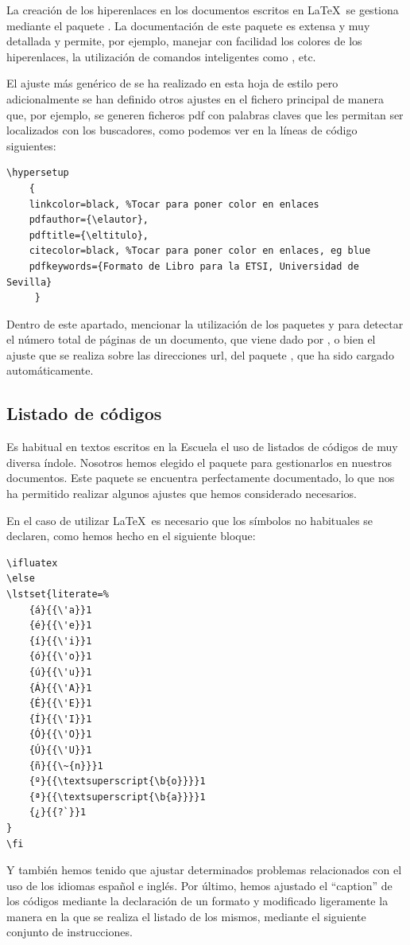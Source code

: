 La creación de los hiperenlaces en los documentos escritos en \LaTeX\ se gestiona mediante el paquete . La documentación de este paquete es extensa y muy detallada y permite, por ejemplo, manejar con facilidad los colores de los hiperenlaces, la utilización de comandos inteligentes como , etc. 

El ajuste más genérico de  se ha realizado en esta hoja de estilo pero adicionalmente se han definido otros ajustes en el fichero principal de manera que, por ejemplo, se generen ficheros pdf con palabras claves que les permitan ser localizados con los buscadores, como podemos ver en la líneas de código siguientes:

\begin{lstlisting}[frame=none]
\hypersetup
	{
 	linkcolor=black, %Tocar para poner color en enlaces
	pdfauthor={\elautor},
	pdftitle={\eltitulo}, 
	citecolor=black, %Tocar para poner color en enlaces, eg blue
	pdfkeywords={Formato de Libro para la ETSI, Universidad de Sevilla}	
	 }
\end{lstlisting}
  
Dentro de este apartado, mencionar la utilización de los paquetes  y  para detectar el número total de páginas de un documento, que viene dado por , o bien el ajuste que se realiza sobre las direcciones url, del paquete , que ha sido cargado automáticamente.

\subsection{Listado de códigos}
Es habitual en textos escritos en la Escuela el uso de listados de códigos de muy diversa índole. Nosotros hemos elegido el paquete  para gestionarlos en nuestros documentos. Este paquete se encuentra perfectamente documentado, lo que nos ha permitido realizar algunos ajustes que hemos considerado necesarios. 

En el caso de utilizar \LaTeX\ es necesario que los símbolos no habituales se declaren, como hemos hecho en el siguiente bloque:
\begin{lstlisting}[frame=none]
\ifluatex
\else
\lstset{literate=%
    {á}{{\'a}}1
    {é}{{\'e}}1
    {í}{{\'i}}1
    {ó}{{\'o}}1
    {ú}{{\'u}}1
    {Á}{{\'A}}1
    {É}{{\'E}}1
    {Í}{{\'I}}1
    {Ó}{{\'O}}1
    {Ú}{{\'U}}1
    {ñ}{{\~{n}}}1
    {º}{{\textsuperscript{\b{o}}}}1
    {ª}{{\textsuperscript{\b{a}}}}1
    {¿}{{?`}}1
}
\fi
\end{lstlisting}
%
Y también hemos tenido que ajustar determinados problemas relacionados con el uso de los idiomas español e inglés.  Por último, hemos ajustado el ``caption'' de los códigos mediante la declaración de un formato y modificado ligeramente la manera en la que se realiza el listado de los mismos, mediante el siguiente conjunto de instrucciones.
 
